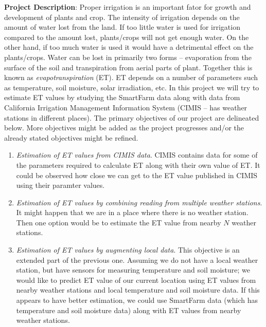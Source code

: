 \documentclass[12pt]{article}
\begin{document}
\noindent
\textbf{Project Description}: Proper irrigation is an important fator for growth and development of plants and crop. The intensity of irrigation depends on the amount of water lost from the land. If too little water is used for irrigation compared to the amount lost, plants/crops will not get enough water. On the other hand, if too much water is used it would have a detrimental effect on the plants/crops. Water can be lost in primarily two forms -- evaporation from the surface of the soil and transpiration from aerial parts of plant. Together this is known as \textit{evapotranspiration} (ET). ET depends on a number of parameters such as temperature, soil moisture, solar irradiation, etc. In this project we will try to estimate ET values by studying the SmartFarm data along with data from California Irrigation Management Information System (CIMIS -- has weather stations in different places). The primary objectives of our project are delineated below. More objectives might be added as the project progresses and/or the already stated objectives might be refined.
\begin{enumerate}
	\item \textit{Estimation of ET values from CIMIS data}. CIMIS contains data for some of the parameters required to calculate ET along with their own value of ET. It could be observed how close we can get to the ET value published in CIMIS using their paramter values.
	\item \textit{Estimation of ET values by combining reading from multiple weather stations}. It might happen that we are in a place where there is no weather station. Then one option would be to estimate the ET value from nearby $N$ weather stations.
	\item \textit{Estimation of ET values by augmenting local data}. This objective is an extended part of the previous one. Assuming we do not have a local weather station, but have sensors for measuring temperature and soil moisture; we would like to predict ET value of our current location using ET values from nearby weather stations and local temperature and soil moisture data. If this appears to have better estimation, we could use SmartFarm data (which has temperature and soil moisture data) along with ET values from nearby weather stations.
\end{enumerate}
\end{document}
